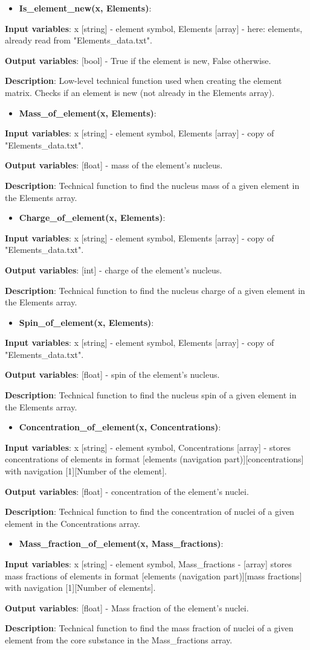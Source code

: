 \documentclass[a4paper,12pt]{article}
\newcommand{\namefunction}[4]{
  \begin{itemize}
    \item \textbf{#1}:
  \end{itemize}
  
  \textbf{Input variables}: #2.
  
  \textbf{Output variables}: #4.
  
  \textbf{Description}: #3.
}
\begin{document}
\vspace{1em}

\namefunction{Is\_element\_new(x, Elements)}{x [string] - element symbol, Elements [array] - here: elements, already read from "Elements\_data.txt"}{Low-level technical function used when creating the element matrix. Checks if an element is new (not already in the Elements array)}{[bool] - True if the element is new, False otherwise}

\vspace{1em}

\namefunction{Mass\_of\_element(x, Elements)}{x [string] - element symbol, Elements [array] - copy of "Elements\_data.txt"}{Technical function to find the nucleus mass of a given element in the Elements array}{[float] - mass of the element's nucleus}

\vspace{1em}

\namefunction{Charge\_of\_element(x, Elements)}{x [string] - element symbol, Elements [array] - copy of "Elements\_data.txt"}{Technical function to find the nucleus charge of a given element in the Elements array}{[int] - charge of the element's nucleus}

\vspace{1em}

\namefunction{Spin\_of\_element(x, Elements)}{x [string] - element symbol, Elements [array] - copy of "Elements\_data.txt"}{Technical function to find the nucleus spin of a given element in the Elements array}{[float] - spin of the element's nucleus}

\vspace{1em}

\namefunction{Concentration\_of\_element(x, Concentrations)}{x [string] - element symbol, Concentrations [array] - stores concentrations of elements in format [elements (navigation part)][concentrations] with navigation [1][Number of the element]}{Technical function to find the concentration of nuclei of a given element in the Concentrations array}{[float] - concentration of the element's nuclei}

\vspace{1em}

\namefunction{Mass\_fraction\_of\_element(x, Mass\_fractions)}{x [string] - element symbol, Mass\_fractions - [array] stores mass fractions of elements in format [elements (navigation part)][mass fractions] with navigation [1][Number of elements]}{Technical function to find the mass fraction of nuclei of a given element from the core substance in the Mass\_fractions array}{[float] - Mass fraction of the element's nuclei}
\end{document}
